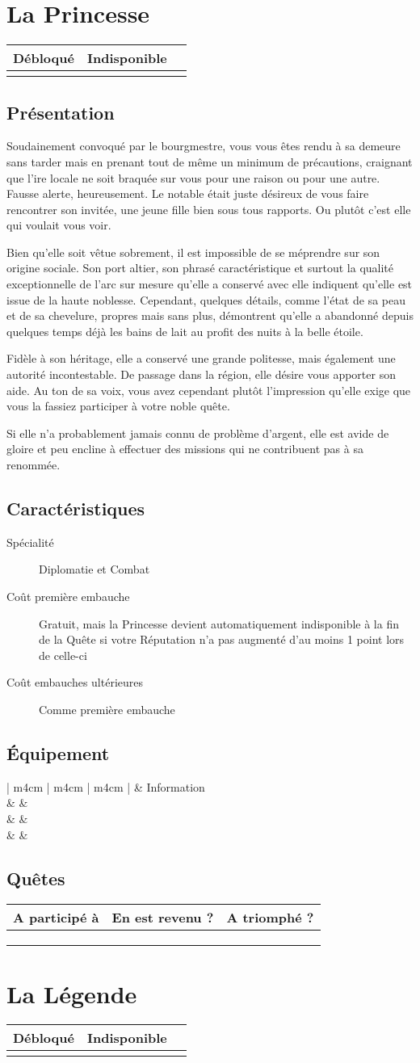 \documentclass{report}
\newcommand{\hero}[5]{
    \herostats{#1}{#2}{#3}{#4}

    \fullbleed{#5}

    \herosheet
}
\newcommand{\herostats}[4]{
    \section{Présentation}

    #1

    \section{Caractéristiques}

    \begin{description}
        \item[Spécialité] #2
        \item[Coût première embauche] #3
        \item[Coût embauches ultérieures] #4
    \end{description}
}
\newcommand{\herosheet}{
    \section{Équipement}

    \begin{tabular}{ | m{4cm} | m{4cm} | m{4cm} | }
        \hline
        \multicolumn{2}{| m{8cm} |}{Équipement} & Information\\
        \hline
        \mytextfield{4cm} & \mytextfield{4cm} & \mytextfield{4cm}\\
        \hline
        \mytextfield{4cm} & \mytextfield{4cm} & \mytextfield{4cm}\\
        \hline
        \mytextfield{4cm} & \mytextfield{4cm} & \mytextfield{4cm}\\
        \hline
    \end{tabular}

    \section{Quêtes}

    \begin{tabular}{ | m{7cm} | m{2.5cm} | m{2.5cm} |}
        \hline
        A participé à & En est revenu ? & A triomphé ?\\
        \hline
        \mytextfield{7cm} & \mycheckbox & \mycheckbox \\ 
        \hline
        \mytextfield{7cm} & \mycheckbox & \mycheckbox \\ 
        \hline
        \mytextfield{7cm} & \mycheckbox & \mycheckbox \\ 
        \hline
    \end{tabular}
}
\newcommand{\lockedhero}{
\begin{tabular}{ | m{4cm} | m{4cm} | m{4cm} | }
    \hline
    Débloqué & Indisponible\\
    \hline
    \mycheckbox & \mycheckbox \\
    \hline
\end{tabular}
}
\begin{document}
\chapter{La Princesse}

\lockedhero

\hero{
Soudainement convoqué par le bourgmestre, vous vous êtes rendu à sa demeure sans tarder mais en prenant tout de même un minimum de précautions, craignant que l'ire locale ne soit braquée sur vous pour une raison ou pour une autre. Fausse alerte, heureusement. Le notable était juste désireux de vous faire rencontrer son invitée, une jeune fille bien sous tous rapports. Ou plutôt c'est elle qui voulait vous voir.

Bien qu'elle soit vêtue sobrement, il est impossible de se méprendre sur son origine sociale. Son port altier, son phrasé caractéristique et surtout la qualité exceptionnelle de l'arc sur mesure qu'elle a conservé avec elle indiquent qu'elle est issue de la haute noblesse. Cependant, quelques détails, comme l'état de sa peau et de sa chevelure, propres mais sans plus, démontrent qu'elle a abandonné depuis quelques temps déjà les bains de lait au profit des nuits à la belle étoile.

Fidèle à son héritage, elle a conservé une grande politesse, mais également une autorité incontestable. De passage dans la région, elle désire vous apporter son aide. Au ton de sa voix, vous avez cependant plutôt l'impression qu'elle exige que vous la fassiez participer à votre noble quête.

Si elle n'a probablement jamais connu de problème d'argent, elle est avide de gloire et peu encline à effectuer des missions qui ne contribuent pas à sa renommée.
}{
Diplomatie et Combat
}{
Gratuit, mais la Princesse devient automatiquement indisponible à la fin de la Quête si votre Réputation n'a pas augmenté d'au moins 1 point lors de celle-ci
}{
Comme première embauche
}{images/princess.jpg}

\chapter{La Légende}

\lockedhero
\end{document}
